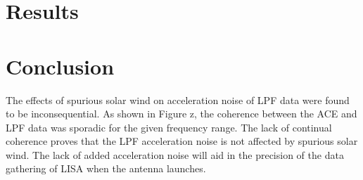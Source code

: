 \documentclass[%
 reprint,
 amsmath,amssymb,
 aps,
]{revtex4-2}
\begin{document}
\section{Results}

\section{Conclusion}
The effects of spurious solar wind on acceleration noise of LPF data were found to be inconsequential. As shown in Figure z, the coherence between the ACE and LPF data was sporadic for the given frequency range. The lack of continual coherence proves that the LPF acceleration noise is not affected by spurious solar wind.  The lack of added acceleration noise will aid in the precision of the data gathering of LISA when the antenna launches.



\nocite{*}

\end{document}
